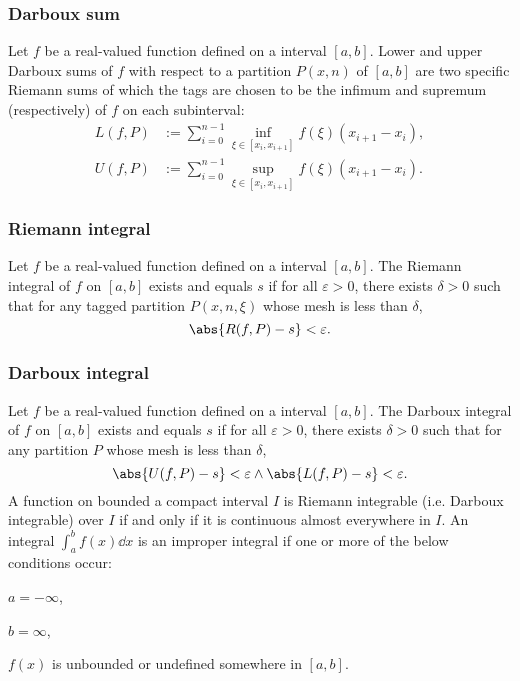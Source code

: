 \documentclass[a4paper,12pt]{report}
\begin{document}
\subsubsection{Darboux sum}
Let $f$ be a real-valued function defined on a interval $[a,b]$. Lower and upper Darboux sums of $f$ with respect to a partition $P(x,n)$ of $[a,b]$ are two specific Riemann sums of which the tags are chosen to be the infimum and supremum (respectively) of $f$ on each subinterval:
\[\begin{aligned}
L(f,P)&:=\sum_{i=0}^{n-1}\inf_{\xi\in [x_i,x_{i+1}]}f(\xi)(x_{i+1}-x_i),\\
U(f,P)&:=\sum_{i=0}^{n-1}\sup_{\xi\in [x_i,x_{i+1}]}f(\xi)(x_{i+1}-x_i).
\end{aligned}\] 
\subsubsection{Riemann integral}
Let $f$ be a real-valued function defined on a interval $[a,b]$. The Riemann integral of $f$ on $[a,b]$ exists and equals $s$ if for all $\varepsilon > 0$, there exists $\delta > 0$ such that for any tagged partition $P(x,n,\xi)$ whose mesh is less than $\delta$,
\[\abs{R(f,P)-s}<\varepsilon .\]
\subsubsection{Darboux integral}
Let $f$ be a real-valued function defined on a interval $[a,b]$. The Darboux integral of $f$ on $[a,b]$ exists and equals $s$ if for all $\varepsilon > 0$, there exists $\delta > 0$ such that for any partition $P$ whose mesh is less than $\delta$,
\[\abs{U(f,P)-s}<\varepsilon \land \abs{L(f,P)-s}<\varepsilon.\]
A function on bounded a compact interval $I$ is Riemann integrable (i.e. Darboux integrable) over $I$ if and only if it is continuous almost everywhere in $I$.
An integral $\int _{a}^{b}f(x)\dd{x}$ is an improper integral if one or more of the below conditions occur:
\ben
\item $a=-\infty$,
\item $b=\infty$,
\item $f(x)$ is unbounded or undefined somewhere in $[a,b]$.
\een
\end{document}
